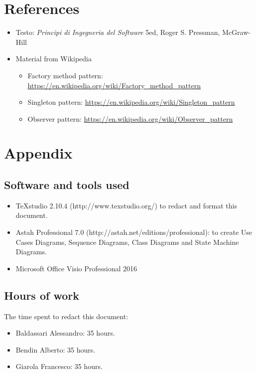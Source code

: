 \documentclass[a4paper,11pt]{report} %
\begin{document}
	\section{References}
	\begin{itemize}
		\item Testo: \textit{Principi di Ingegneria del Software} 5ed, Roger S. Pressman, McGraw-Hill
		\item Material from Wikipedia
		\begin{itemize}
			\item Factory method pattern: \href{https://en.wikipedia.org/wiki/Factory_method_pattern}{https://en.wikipedia.org/wiki/Factory\_method\_pattern}
			\item Singleton pattern: \href{https://en.wikipedia.org/wiki/Singleton_pattern}{https://en.wikipedia.org/wiki/Singleton\_pattern}
			\item Observer pattern: \href{https://en.wikipedia.org/wiki/Observer_pattern}{https://en.wikipedia.org/wiki/Observer\_pattern}
		\end{itemize}
	\end{itemize}
	
	
	\section{Appendix}
	
	\subsection{Software and tools used}
	\begin{itemize}
		\item TeXstudio 2.10.4 (http://www.texstudio.org/) to redact and format this document.
		\item Astah Professional 7.0 (http://astah.net/editions/professional): to create Use
		Cases Diagrams, Sequence Diagrams, Class Diagrams and State Machine	Diagrams.
		\item Microsoft Office Visio Professional 2016
	\end{itemize}
	
	\subsection{Hours of work} The time spent to redact this document:
	\begin{itemize}
		\item Baldassari Alessandro: 35 hours.
		\item Bendin Alberto: 35 hours.
		\item Giarola Francesco: 35 hours.
	\end{itemize}
\end{document}

